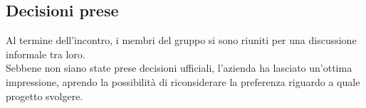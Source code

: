 \subsection{Decisioni prese}
Al termine dell'incontro, i membri del gruppo si sono riuniti per una discussione informale tra loro. \\
Sebbene non siano state prese decisioni ufficiali, l'azienda ha lasciato un'ottima impressione, aprendo la possibilità di riconsiderare la preferenza riguardo a quale progetto svolgere.